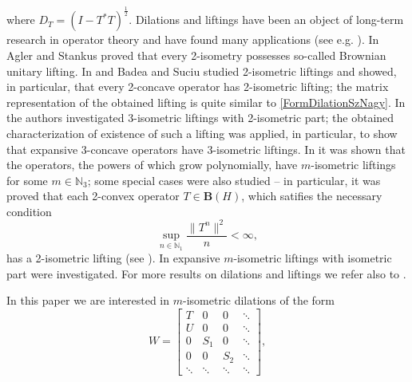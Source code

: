 \documentclass{amsart}
\theoremstyle{definition}
\numberwithin{equation}{section}
\begin{document}
where $ D_{T} = (I-T^{\ast}T)^{\frac{1}{2}} $. Dilations and liftings have been an object of long-term research in operator theory and have found many applications (see e.g. \cite{foiasCommutantLiftingInterpolationProblem}). In \cite[Theorem 5.80]{aglerMIsometricTransformationsOfHilbertSpaceII} Agler and Stankus proved that every 2-isometry possesses so-called Brownian unitary lifting. In \cite{badeaCauchyDual2IsometricLiftingsOfConcave} and \cite{badeaHilbertSpaceOperatorsWith2IsometricDilations} Badea and Suciu studied 2-isometric liftings and showed, in particular, that every 2-concave operator has 2-isometric lifting; the matrix representation of the obtained lifting is quite similar to \eqref{FormDilationSzNagy}. In \cite{suciuCouplingOfOperatorsWith2IsometriesIn3IsometricLiftings} the authors investigated 3-isometric liftings with 2-isometric part; the obtained characterization of existence of such a lifting was applied, in particular, to show that expansive 3-concave operators have 3-isometric liftings. In \cite{badeaHighOrderIsometricLiftings} it was shown that the operators, the powers of which grow polynomially, have $ m $-isometric liftings for some $ m\in \mathbb{N}_{3} $; some special cases were also studied -- in particular, it was proved that each 2-convex operator $ T\in \mathbf{B}(H) $, which satifies the necessary condition
\begin{equation*}
    \sup_{n\in \mathbb{N}_{1}} \frac{\lVert T^{n}\rVert^{2}}{n} < \infty,
\end{equation*}
has a 2-isometric lifting (see \cite[Theorem 3.2]{badeaHighOrderIsometricLiftings}). In \cite{suciuOperatorsExpansiveMisometric} expansive $ m $-isometric liftings with isometric part were investigated. For more results on dilations and liftings we refer also to \cite{suciuBrownianExtensionsThreeIsometries,suciuOnOperatorsWith2IsometricLiftings,suciuTriangulationsOfOperators2IsometricLiftings}.\par
In this paper we are interested in $ m $-isometric dilations of the form
\begin{equation}
    \label{FormDilationMatrixIntr}
    W = \begin{bmatrix}
        T & 0 & 0 & \ddots\\
        U & 0 & 0 & \ddots\\
        0 & S_{1} & 0 & \ddots\\
        0 & 0 & S_{2} & \ddots\\
        \ddots & \ddots & \ddots & \ddots
    \end{bmatrix},
\end{equation}
\end{document}
